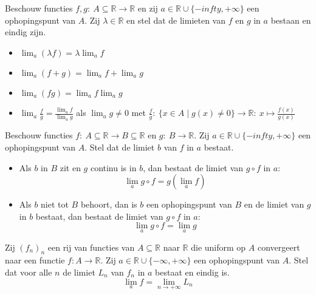 \documentclass[main.tex]{subfiles}
\begin{document}
\begin{pr}
  Beschouw functies $f,g:\ A \subseteq \mathbb{R} \rightarrow \mathbb{R}$ en zij $a\in \mathbb{R} \cup \{-infty,+\infty\}$ een ophopingspunt van $A$.
  Zij $\lambda \in \mathbb{R}$ en stel dat de limieten van $f$ en $g$ in $a$ bestaan en eindig zijn.
  \begin{itemize}
  \item $\lim_{a}(\lambda f) = \lambda \lim_{a} f$
  \item $\lim_{a}(f+g) = \lim_{a}f + \lim_{a}g$
  \item $\lim_{a}(fg) = \lim_{a}f \lim_{a}g$
  \item $\lim_{a}\frac{f}{g} = \frac{\lim_{a}f}{\lim_{a}g}$ als $\lim_{a}g \neq 0$ met $\frac{f}{g}:\ \{x\in A\mid g(x) \neq 0\} \rightarrow \mathbb{R}:\ x \mapsto \frac{f(x)}{g(x)}$
  \end{itemize}
\end{pr}


\begin{pr}
  Beschouw functies $f:\ A \subseteq \mathbb{R} \rightarrow B \subseteq \mathbb{R}$ en $g:\ B \rightarrow \mathbb{R}$.
  Zij $a\in \mathbb{R} \cup \{-infty,+\infty\}$ een ophopingspunt van $A$.
  Stel dat de limiet $b$ van $f$ in $a$ bestaat.
  \begin{itemize}
  \item Als $b$ in $B$ zit en $g$ continu is in $b$, dan bestaat de limiet van $g\circ f$ in $a$:
    \[ \lim_{a}g\circ f = g(\lim_{a}f) \]
  \item Als $b$ niet tot $B$ behoort, dan is $b$ een ophopingspunt van $B$ en de limiet van $g$ in $b$ bestaat, dan bestaat de limiet van $g\circ f$ in $a$:
    \[ \lim_{a}g\circ f = \lim_{a}g \]
  \end{itemize}
\end{pr}

\begin{st}
  Zij $(f_{n})_{n}$ een rij van functies van $A \subseteq \mathbb{R}$ naar $\mathbb{R}$ die uniform op $A$ convergeert naar een functie $f: A \rightarrow \mathbb{R}$.
  Zij $a\in \mathbb{R} \cup \{-\infty,+\infty\}$ een ophopingspunt van $A$.
  Stel dat voor alle $n$ de limiet $L_{n}$ van $f_{n}$ in $a$ bestaat en eindig is.
  \[ \lim_{a}f = \lim_{n \rightarrow +\infty} L_{n} \]
\end{st}
\end{document}
